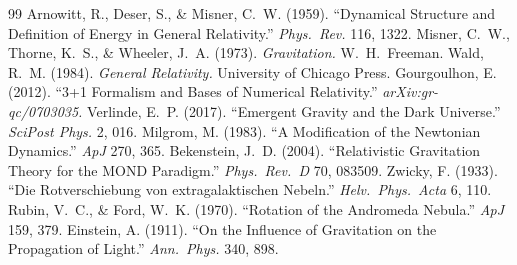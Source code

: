 \documentclass[11pt,a4paper]{article}
\theoremstyle{definition}
\begin{document}
\begin{thebibliography}{99}
 Arnowitt, R., Deser, S., \& Misner, C.~W. (1959). ``Dynamical Structure and Definition of Energy in General Relativity.'' \textit{Phys.~Rev.} 116, 1322.
 Misner, C.~W., Thorne, K.~S., \& Wheeler, J.~A. (1973). \textit{Gravitation.} W.~H.~Freeman.
 Wald, R.~M. (1984). \textit{General Relativity.} University of Chicago Press.
 Gourgoulhon, E. (2012). ``3+1 Formalism and Bases of Numerical Relativity.'' \textit{arXiv:gr-qc/0703035.}
 Verlinde, E.~P. (2017). ``Emergent Gravity and the Dark Universe.'' \textit{SciPost Phys.} 2, 016.
 Milgrom, M. (1983). ``A Modification of the Newtonian Dynamics.'' \textit{ApJ} 270, 365.
 Bekenstein, J.~D. (2004). ``Relativistic Gravitation Theory for the MOND Paradigm.'' \textit{Phys.~Rev.~D} 70, 083509.
 Zwicky, F. (1933). ``Die Rotverschiebung von extragalaktischen Nebeln.'' \textit{Helv.~Phys.~Acta} 6, 110.
 Rubin, V.~C., \& Ford, W.~K. (1970). ``Rotation of the Andromeda Nebula.'' \textit{ApJ} 159, 379.
 Einstein, A. (1911). ``On the Influence of Gravitation on the Propagation of Light.'' \textit{Ann.~Phys.} 340, 898.
\end{thebibliography}
\end{document}
